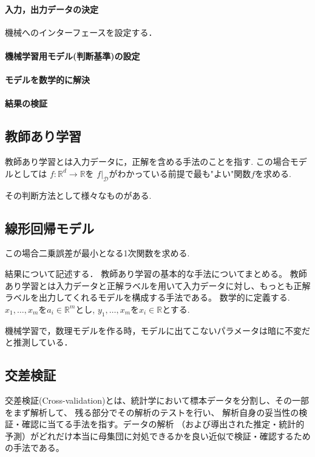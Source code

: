 \documentclass{ujarticle}
\begin{document}
\paragraph{入力，出力データの決定}
機械へのインターフェースを設定する．

\paragraph{機械学習用モデル(判断基準)の設定}

\paragraph{モデルを数学的に解決}

\paragraph{結果の検証}

\subsection{教師あり学習}
\label{sub:教師あり学習}
教師あり学習とは入力データに，正解を含める手法のことを指す.
この場合モデルとしては
$f : \mathbb{R}^d \to \mathbb{R}$を
$f|_{\mathcal{D}}$がわかっている前提で最も"よい"関数$f$を求める.

その判断方法として様々なものがある.

\subsection{線形回帰モデル}
\label{sub:線形回帰モデル}
この場合二乗誤差が最小となる1次関数を求める.

結果について記述する．
教師あり学習の基本的な手法についてまとめる。
教師あり学習とは入力データと正解ラベルを用いて入力データに対し、もっとも正解ラベルを出力してくれるモデルを構成する手法である。
数学的に定義する.
$x_1,\dots,x_m$を$a_i \in \mathbb{R}^m$とし,
$y_1, \dots,x_m$を$x_i \in \mathbb{R}$とする.

機械学習で，数理モデルを作る時，モデルに出てこないパラメータは暗に不変だと推測している．


\subsection{交差検証}
\label{sub:交差検証}

交差検証(Cross-validation)とは、統計学において標本データを分割し、その一部をまず解析して、
残る部分でその解析のテストを行い、
解析自身の妥当性の検証・確認に当てる手法を指す。データの解析
（および導出された推定・統計的予測）がどれだけ本当に母集団に対処できるかを良い近似で検証・確認するための手法である。
\end{document}
